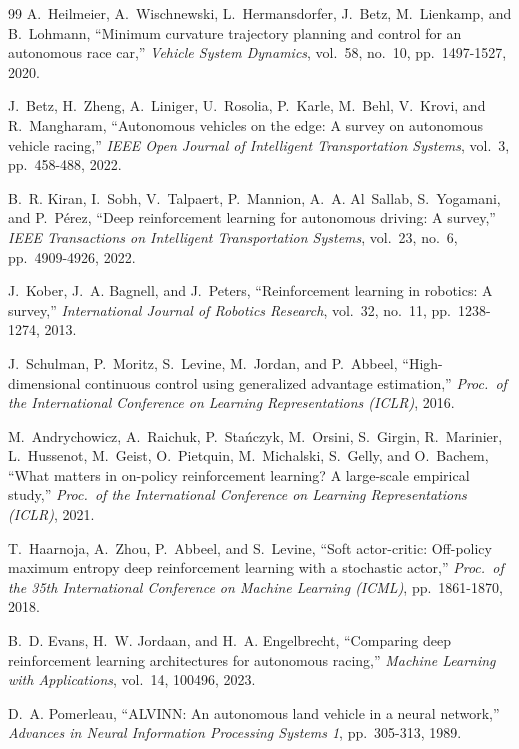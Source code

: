 \documentclass[10pt,twocolumn,twoside]{article}
\begin{document}
{\begin{thebibliography}{99}
A.~Heilmeier, A.~Wischnewski, L.~Hermansdorfer, J.~Betz, M.~Lienkamp, and
B.~Lohmann, ``Minimum curvature trajectory planning and control for an
autonomous race car,'' \emph{Vehicle System Dynamics}, vol.~58, no.~10,
pp.~1497-1527, 2020.

J.~Betz, H.~Zheng, A.~Liniger, U.~Rosolia, P.~Karle, M.~Behl, V.~Krovi, and
R.~Mangharam, ``Autonomous vehicles on the edge: A survey on autonomous vehicle
racing,'' \emph{IEEE Open Journal of Intelligent Transportation Systems},
vol.~3, pp.~458-488, 2022.

B.~R. Kiran, I.~Sobh, V.~Talpaert, P.~Mannion, A.~A. Al~Sallab, S.~Yogamani,
and P.~P\'erez, ``Deep reinforcement learning for autonomous driving: A
survey,'' \emph{IEEE Transactions on Intelligent Transportation Systems},
vol.~23, no.~6, pp.~4909-4926, 2022.

J.~Kober, J.~A. Bagnell, and J.~Peters, ``Reinforcement learning in robotics:
A survey,'' \emph{International Journal of Robotics Research}, vol.~32,
no.~11, pp.~1238-1274, 2013.

J.~Schulman, P.~Moritz, S.~Levine, M.~Jordan, and P.~Abbeel,
``High-dimensional continuous control using generalized advantage
estimation,'' \emph{Proc.\ of the International Conference on Learning
Representations (ICLR)}, 2016.

M.~Andrychowicz, A.~Raichuk, P.~Sta\'nczyk, M.~Orsini, S.~Girgin, R.~Marinier,
L.~Hussenot, M.~Geist, O.~Pietquin, M.~Michalski, S.~Gelly, and O.~Bachem,
``What matters in on-policy reinforcement learning? A large-scale empirical
study,'' \emph{Proc.\ of the International Conference on Learning
Representations (ICLR)}, 2021.

T.~Haarnoja, A.~Zhou, P.~Abbeel, and S.~Levine, ``Soft actor-critic:
Off-policy maximum entropy deep reinforcement learning with a stochastic
actor,'' \emph{Proc.\ of the 35th International Conference on Machine Learning
(ICML)}, pp.~1861-1870, 2018.

B.~D. Evans, H.~W. Jordaan, and H.~A. Engelbrecht, ``Comparing deep
reinforcement learning architectures for autonomous racing,'' \emph{Machine
Learning with Applications}, vol.~14, 100496, 2023.

D.~A. Pomerleau, ``ALVINN: An autonomous land vehicle in a neural network,''
\emph{Advances in Neural Information Processing Systems 1}, pp.~305-313, 1989.


\end{thebibliography}}
\end{document}
